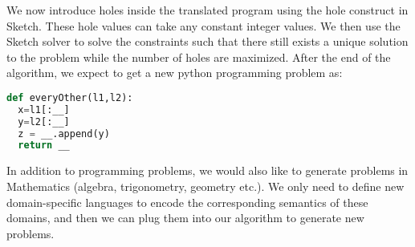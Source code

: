 We now introduce holes inside the translated program using the hole construct in Sketch. These hole values can take any constant integer values. We then use the Sketch solver to solve the constraints such that there still exists a unique solution to the problem while the number of holes are maximized. After the end of the algorithm, we expect to get a new python programming problem as:

\singlespace
\begin{lstlisting}[language=Python, frame=single]
def everyOther(l1,l2):
  x=l1[:__]
  y=l2[:__]
  z = __.append(y)
  return __
\end{lstlisting}
\doublespace

In addition to programming problems, we would also like to generate problems in Mathematics (algebra, trigonometry, geometry etc.). We only need to define new domain-specific languages to encode the corresponding semantics of these domains, and then we can plug them into our algorithm to generate new problems.
